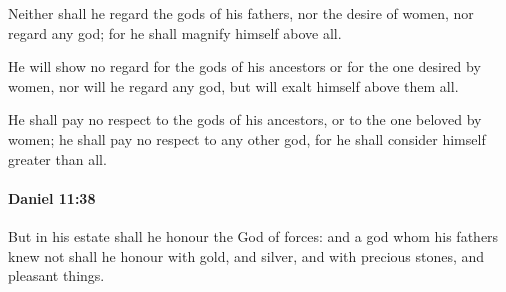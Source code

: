 			\begin{versebox}
					\item[BHS] 
					\item[LXX] 
					\item[ASV] Neither shall he regard the gods of his fathers, nor the desire of women, nor regard any god; for he shall magnify himself above all.
					\item[NIV] He will show no regard for the gods of his ancestors or for the one desired by women, nor will he regard any god, but will exalt himself above them all.
					\item[NRSV] He shall pay no respect to the gods of his ancestors, or to the one beloved by women; he shall pay no respect to any other god, for he shall consider himself greater than all.
			\end{versebox}

		\paragraph{Daniel 11:38} %
			\label{DANIEL-11-38}

			But in his estate shall he honour the God of forces: and a god whom his fathers knew not shall he honour with gold, and silver, and with precious stones, and pleasant things.


